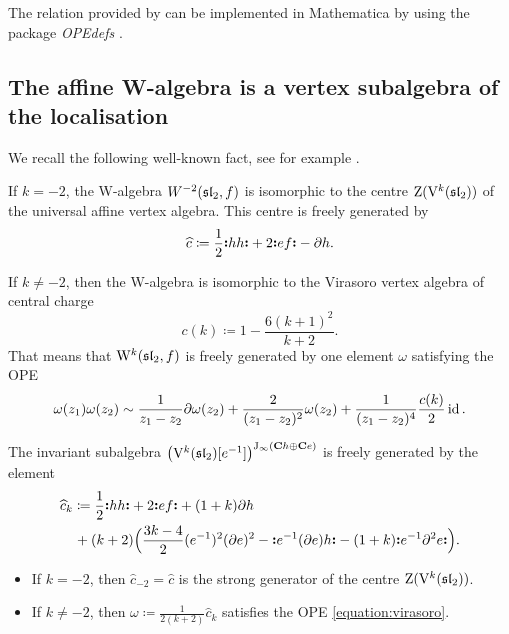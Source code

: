 The relation provided by  can be implemented in Mathematica by using the package \emph{OPEdefs} \cite{thielemans1991mathematica}.



\subsection{The affine W-algebra is a vertex subalgebra of the localisation}

We recall the following well-known fact, see for example \cite[Section 15.3.2]{frenkel2004vertex}.

\begin{theorem} \label{theorem:w-algebra-sl2}
	If $k = -2$, the W-algebra $W^{-2}(\sl_2, f)$ is isomorphic to the centre $\operatorname{Z}(\V^k(\sl_2))$ of the universal affine vertex algebra. This centre is freely generated by
	\[ \widehat{c} \coloneqq \frac{1}{2} \NO{h h} + 2 \NO{e f} - \partial h. \]
	
	If $k \neq -2$, then the W-algebra is isomorphic to the Virasoro vertex algebra of central charge 
	\[ c(k) \coloneqq 1 - \frac{6 (k + 1)^2}{k + 2}. \]
	That means that $\W^k(\sl_2, f)$ is freely generated by one element $\omega$ satisfying the OPE
	\begin{equation} \label{equation:virasoro} \omega(z_1) \omega(z_2) \sim \frac{1}{z_1 - z_2} \partial \omega(z_2) + \frac{2}{(z_1 - z_2)^2} \omega(z_2) + \frac{1}{(z_1 - z_2)^4} \frac{c(k)}{2} \id.  \end{equation}
\end{theorem}

\begin{proposition} \label{proposition:invariant-generator-sl2}
	The invariant subalgebra $\big(\V^k(\sl_2)[e^{-1}]\big)^{\J_\infty(\C h \oplus \C e)}$ is freely generated by the element
	\[ \begin{multlined}
		\widehat{c}_k \coloneqq \frac{1}{2} \NO{h h} + 2 \NO{e f} + (1 + k) \partial h \\ 
		+ (k + 2) \Big(\frac{3 k - 4}{2} (e^{-1})^2 (\partial e)^2 -  \NO{e^{-1} (\partial e) h} - (1+k) \NO{e^{-1} \partial^2 e}\Big).
	\end{multlined}  \]
	\begin{itemize}
		\item If $k = -2$, then $\widehat{c}_{-2} = \widehat{c}$ is the strong generator of the centre $\operatorname{Z}(\V^k(\sl_2))$.
		
		\item If $k \neq -2$, then $\omega \coloneqq \frac{1}{2(k + 2)} \widehat{c}_k$ satisfies the OPE \eqref{equation:virasoro}.
	\end{itemize}
\end{proposition}

